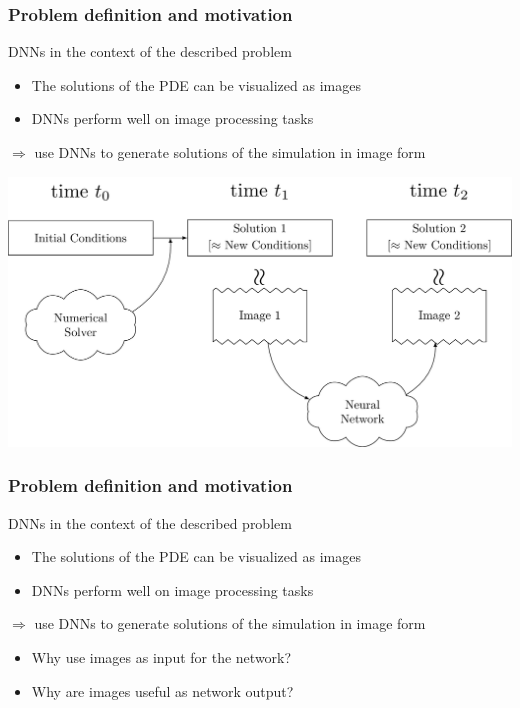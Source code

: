 \documentclass[18pt]{beamer}
\begin{document}
\begin{frame}[t]
  \frametitle{Problem definition and motivation}
  DNNs in the context of the described problem
  \begin{itemize}
  \item The solutions of the PDE can be visualized as images
  \item DNNs perform well on image processing tasks
  \end{itemize}
  $\Longrightarrow$ use DNNs to generate solutions of the simulation in image form \\
  \begin{center}
    \includegraphics[scale=0.16]{images/new/overview}
  \end{center}
\end{frame}


\begin{frame}[t]
  \frametitle{Problem definition and motivation}
  DNNs in the context of the described problem
  \begin{itemize}
  \item The solutions of the PDE can be visualized as images
    \item DNNs perform well on image processing tasks
  \end{itemize}
  $\Longrightarrow$ use DNNs to generate solutions of the simulation in image form \\
  \vspace*{1.5cm}
  \begin{itemize}
  \item Why use images as input for the network?
  \item Why are images useful as network output?
  \end{itemize}
\end{frame}
\end{document}
